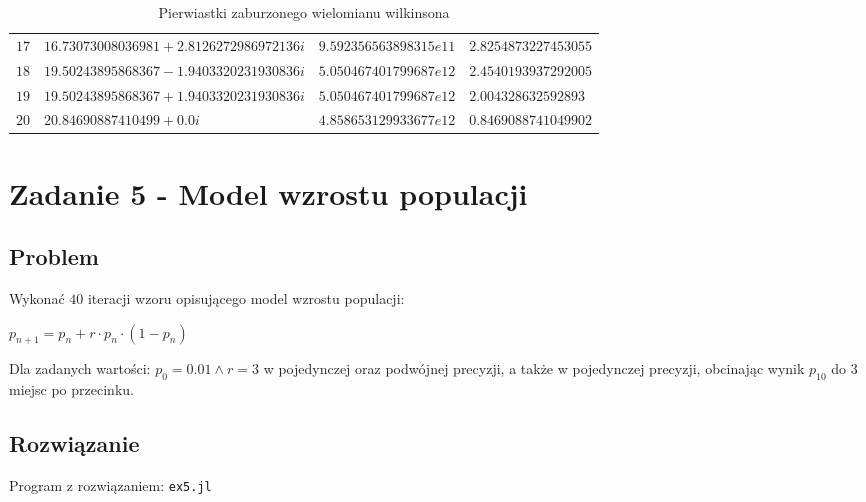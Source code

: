 \documentclass[12pt]{article}
\begin{document}
\begin{table}[h!]
\begin{adjustwidth}{-0.8cm}{}
\begin{tabularx}{1.065\textwidth}{l l l l }
                $17$ & $16.73073008036981 + 2.8126272986972136i$ & $9.592356563898315e11$ & $2.8254873227453055$ \\
                $18$ & $19.50243895868367 - 1.9403320231930836i$ & $5.050467401799687e12$ & $2.4540193937292005$ \\
                $19$ & $19.50243895868367 + 1.9403320231930836i$ & $5.050467401799687e12$ & $2.004328632592893$ \\
                $20$ & $20.84690887410499 + 0.0i$ & $4.858653129933677e12$ & $0.8469088741049902$ \\
                \hline
            \end{tabularx}
            \label{table:wilkinson_distorted}
            \caption{Pierwiastki zaburzonego wielomianu wilkinsona}
            \end{adjustwidth}
        \end{table}

\newpage

\section*{Zadanie 5 - Model wzrostu populacji}
    \subsection*{Problem}
        Wykonać $40$ iteracji wzoru opisującego model wzrostu populacji:
        \begin{center}
        \begin{math}
            p_{n+1} = p_n + r \cdot p_n \cdot (1 - p_n)
        \end{math}
        \end{center}
        \noindent Dla zadanych wartości: $p_0 = 0.01 \land r = 3$ w pojedynczej oraz podwójnej precyzji, a także w pojedynczej precyzji, obcinając wynik $p_10$ do $3$ miejsc po przecinku.

    \subsection*{Rozwiązanie}
        Program z rozwiązaniem: \texttt{ex5.jl}
\end{document}
